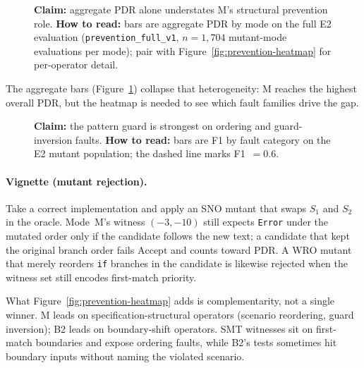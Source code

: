 \begin{figure}[t]
  \centering
  \caption{\textbf{Claim:} aggregate PDR alone understates M's structural
    prevention role.
    \textbf{How to read:} bars are aggregate PDR by mode on the full E2
    evaluation (\texttt{prevention\_full\_v1}, $n{=}1{,}704$ mutant-mode
    evaluations per mode); pair with Figure~\ref{fig:prevention-heatmap} for
    per-operator detail.}
  \label{fig:prevention-bar}
\end{figure}

The aggregate bars (Figure~\ref{fig:prevention-bar}) collapse that heterogeneity:
M reaches the highest overall PDR, but the heatmap is needed to see which
fault families drive the gap.

\begin{figure}[t]
  \centering
  \caption{\textbf{Claim:} the pattern guard is strongest on ordering and
    guard-inversion faults.
    \textbf{How to read:} bars are F1 by fault category on the E2 mutant
    population; the dashed line marks F1~$=0.6$.}
  \label{fig:pattern-f1}
\end{figure}

\paragraph{Vignette (mutant rejection).}
Take a correct  implementation and apply an SNO mutant
that swaps $S_1$ and $S_2$ in the oracle.
Mode~M's witness $(-3,-10)$ still expects \texttt{Error} under the mutated
order only if the candidate follows the new text; a candidate that kept the
original branch order fails $\mathrm{Accept}$ and counts toward PDR.
A WRO mutant that merely reorders \texttt{if} branches in the candidate is
likewise rejected when the witness set still encodes first-match priority.

What Figure~\ref{fig:prevention-heatmap} adds is complementarity, not a single
winner.
M leads on specification-structural operators (scenario reordering, guard
inversion); B2 leads on boundary-shift operators.
SMT witnesses sit on first-match boundaries and expose ordering faults, while
B2's tests sometimes hit boundary inputs without naming the violated scenario.

